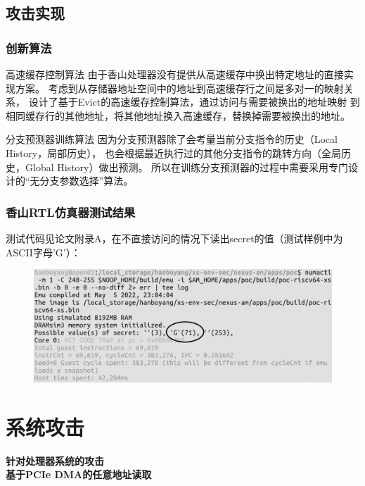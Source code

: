 \documentclass[presentation,aspectratio=169]{beamer}
\begin{document}
\subsection{攻击实现}
\begin{frame}
\frametitle{创新算法}
\begin{block}{高速缓存控制算法}
    由于香山处理器没有提供从高速缓存中换出特定地址的直接实现方案。
    考虑到从存储器地址空间中的地址到高速缓存行之间是多对一的映射关系，
    设计了基于Evict的高速缓存控制算法，通过访问与需要被换出的地址映射
    到相同缓存行的其他地址，将其他地址换入高速缓存，替换掉需要被换出的地址。
\end{block}
\begin{block}{分支预测器训练算法}
    因为分支预测器除了会考量当前分支指令的历史（Local History，局部历史），
    也会根据最近执行过的其他分支指令的跳转方向（全局历史，Global History）做出预测。
    所以在训练分支预测器的过程中需要采用专门设计的“无分支参数选择”算法。
\end{block}
\end{frame}

\begin{frame}
\frametitle{香山RTL仿真器测试结果}
测试代码见论文附录A，在不直接访问的情况下读出secret的值（测试样例中为ASCII字母'G'）：
\begin{figure}[ht]
    \centering
    \includegraphics[width=\textwidth]{../paper/figs/spectre-result.png}
\end{figure}
\end{frame}



\section{系统攻击}

\begin{frame}{}
    \centering
    \Huge\bfseries\textcolor{xmucolor}{针对处理器系统的攻击}\\
    \vspace{1em}
    \large\bfseries\textcolor{xmucolor}{基于PCIe DMA的任意地址读取}
\end{frame}
\end{document}
